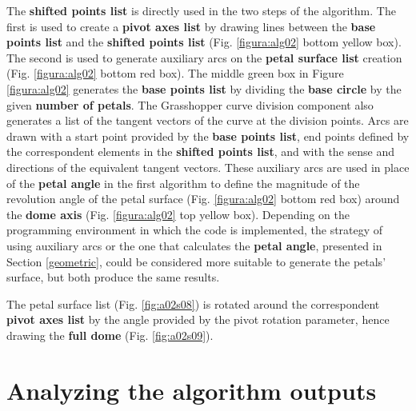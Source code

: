 \documentclass[preprint,12pt,3p]{elsarticle}
\begin{document}
The \textbf{shifted points list} is directly used in the two steps of the algorithm. The first is used to create a \textbf{pivot axes list} by drawing lines between the \textbf{base points list} and the \textbf{shifted points list} (Fig. \ref{figura:alg02} bottom yellow box). The second is used to generate auxiliary arcs on the \textbf{petal surface list} creation (Fig. \ref{figura:alg02} bottom red box). The middle green box in Figure \ref{figura:alg02} generates the \textbf{base points list} by dividing the \textbf{base circle} by the given \textbf{number of petals}. The Grasshopper curve division component also generates a list of the tangent vectors of the curve at the division points. Arcs are drawn with a start point provided by the \textbf{base points list}, end points defined by the correspondent elements in the \textbf{shifted points list}, and with the sense and directions of the equivalent tangent vectors. These auxiliary arcs are used in place of the \textbf{petal angle} in the first algorithm to define the magnitude of the revolution angle of the petal surface (Fig. \ref{figura:alg02} bottom red box) around the \textbf{dome axis} (Fig. \ref{figura:alg02} top yellow box). Depending on the programming environment in which the code is implemented, the strategy of using auxiliary arcs or the one that calculates the \textbf{petal angle}, presented in Section \ref{geometric}, could be considered more suitable to generate the petals' surface, but both produce the same results.

The petal surface list (Fig. \ref{fig:a02s08}) is rotated around the correspondent \textbf{pivot axes list} by the angle provided by the pivot rotation parameter, hence drawing the \textbf{full dome} (Fig. \ref{fig:a02s09}).

\section{Analyzing the algorithm outputs}
\label{outs01}
\end{document}
